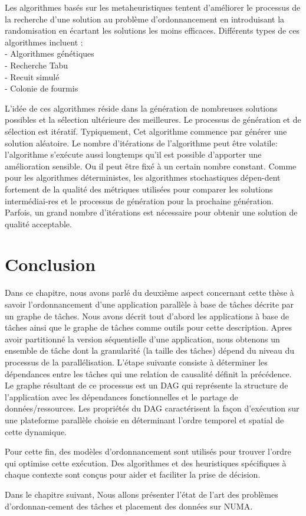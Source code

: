 Les algorithmes basés sur les metaheuristiques tentent d'améliorer le processus de la recherche d'une solution au problème d'ordonnancement en introduisant la randomisation en écartant les solutions les moins efficaces. Différents types de ces algorithmes incluent :\\
- Algorithmes génétiques \cite{GRA99}\\ 
- Recherche Tabu\\
- Recuit simulé\\
- Colonie de fourmis

L'idée de ces algorithmes réside dans la génération de nombreuses solutions possibles et la sélection ultérieure des meilleures. Le processus de génération et de sélection est itératif. Typiquement, Cet algorithme commence par générer une solution aléatoire. Le nombre d'itérations de l'algorithme peut être volatile: l'algorithme s'exécute aussi longtemps qu'il est possible d'apporter une amélioration sensible. Ou il peut être fixé à un certain nombre constant. Comme pour les algorithmes déterministes, les algorithmes stochastiques dépen-dent fortement de la qualité des métriques utilisées pour comparer les solutions intermédiai-res et le processus de génération pour la prochaine génération. Parfois, un grand nombre d'itérations est nécessaire pour obtenir une solution de qualité acceptable.
\newpage
\section{Conclusion}\label{concDAG}
%
Dans ce chapitre, nous avons parlé du deuxième aspect concernant cette thèse à savoir l'ordonnancement d'une application parallèle à base de tâches décrite par un graphe de tâches. 
%
Nous avons décrit tout d’abord les applications à base de tâches ainsi que le graphe de tâches comme outils pour cette description. Apres avoir partitionné la version séquentielle d'une application, nous obtenons un ensemble de tâche dont la granularité (la taille des tâches) dépend du niveau du processus de la parallélisation. L'étape suivante consiste à déterminer les dépendances entre les tâches qui une relation de causalité définit la précédence.
%
Le graphe résultant de ce processus est un DAG qui représente la structure de l'application avec les dépendances fonctionnelles et le partage de données/ressources. Les propriétés du DAG caractérisent la façon d'exécution sur une plateforme parallèle choisie en déterminant l'ordre temporel et spatial de cette dynamique. 
%

Pour cette fin, des modèles d'ordonnancement sont utilisés pour trouver l'ordre qui optimise cette exécution. Des algorithmes et des heuristiques spécifiques à chaque contexte sont conçus pour aider et faciliter la prise de décision.
%

Dans le chapitre suivant, Nous allons présenter l'état de l'art des problèmes d'ordonnan-cement des tâches et placement des données sur NUMA.
